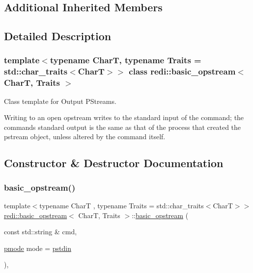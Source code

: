 \subsection*{Additional Inherited Members}


\subsection{Detailed Description}
\subsubsection*{template$<$typename CharT, typename Traits = std\+::char\+\_\+traits$<$\+Char\+T$>$$>$\newline
class redi\+::basic\+\_\+opstream$<$ Char\+T, Traits $>$}

Class template for Output P\+Streams. 

Writing to an open opstream writes to the standard input of the command; the command\textquotesingle{}s standard output is the same as that of the process that created the pstream object, unless altered by the command itself. 

\subsection{Constructor \& Destructor Documentation}
\mbox{\label{classredi_1_1basic__opstream_ac7d4fc3ce22a34257cb43b4f35969605}} 
\subsubsection{\texorpdfstring{basic\+\_\+opstream()}{basic\_opstream()}\hspace{0.1cm}{\footnotesize\ttfamily [1/3]}}
{\footnotesize\ttfamily template$<$typename CharT , typename Traits  = std\+::char\+\_\+traits$<$\+Char\+T$>$$>$ \\
\mbox{\hyperlink{classredi_1_1basic__opstream}{redi\+::basic\+\_\+opstream}}$<$ CharT, Traits $>$\+::\mbox{\hyperlink{classredi_1_1basic__opstream}{basic\+\_\+opstream}} (\begin{DoxyParamCaption}\item[{const std\+::string \&}]{cmd,  }\item[{\mbox{\hyperlink{structredi_1_1pstreams_a1eae4aad88812af03a0fbb3ec13c50b7}{pmode}}}]{mode = {\ttfamily \mbox{\hyperlink{structredi_1_1pstreams_a7a976ce992db857f86a0cc3352e42d3a}{pstdin}}} }\end{DoxyParamCaption})\hspace{0.3cm}{\ttfamily [inline]}, {\ttfamily [explicit]}}




